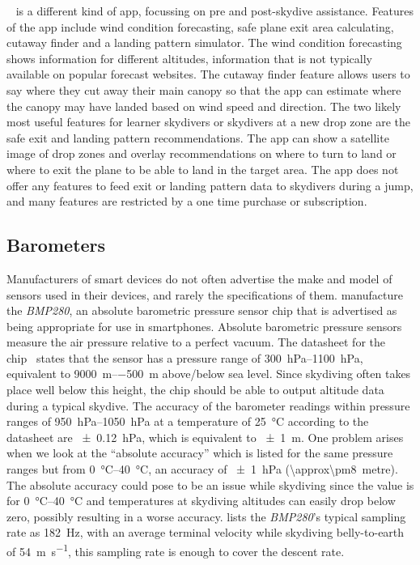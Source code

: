 \documentclass[11pt, twocolumn]{article}
\newcommand{\hPa}{\hecto\pascal} %
\begin{document}
~\cite{inc_spot_2017} is a different kind of app, focussing on pre and post-skydive assistance. Features of the app include wind condition forecasting, safe plane exit area calculating, cutaway finder and a landing pattern simulator. The wind condition forecasting shows information for different altitudes, information that is not typically available on popular forecast websites. The cutaway finder feature allows users to say where they cut away their main canopy so that the app can estimate where the canopy may have landed based on wind speed and direction. The two likely most useful features for learner skydivers or skydivers at a new drop zone are the safe exit and landing pattern recommendations. The app can show a satellite image of drop zones and overlay recommendations on where to turn to land or where to exit the plane to be able to land in the target area. The app does not offer any features to feed exit or landing pattern data to skydivers during a jump, and many features are restricted by a one time purchase or subscription.

\subsection{Barometers}\label{sec:barometers} %

Manufacturers of smart devices do not often advertise the make and model of sensors used in their devices, and rarely the specifications of them. \citeauthor{bosch_bmp280:_2016} manufacture the \textit{BMP280}, an absolute barometric pressure sensor chip that is advertised as being appropriate for use in smartphones. Absolute barometric pressure sensors measure the air pressure relative to a perfect vacuum. The datasheet for the chip~\cite{bosch_bmp280:_2016} states that the sensor has a pressure range of \SIrange{300}{1100}{\hPa}, equivalent to \SIrange{+9000}{-500}{\metre} above/below sea level. Since skydiving often takes place well below this height, the chip should be able to output altitude data during a typical skydive. The accuracy of the barometer readings within pressure ranges of \SIrange{950}{1050}{\hPa} at a temperature of \SI{25}{\degreeCelsius} according to the datasheet are \SI{\pm0.12}{\hPa}, which is equivalent to \SI{\pm1}{\metre}. One problem arises when we look at the ``absolute accuracy'' which is listed for the same pressure ranges but from \SIrange{0}{40}{\degreeCelsius}, an accuracy of \SI{\pm1}{\hPa} (\SI{\approx\pm8}{metre}). The absolute accuracy could pose to be an issue while skydiving since the value is for \SIrange{0}{40}{\degreeCelsius} and temperatures at skydiving altitudes can easily drop below zero, possibly resulting in a worse accuracy. \citeauthor{bosch_bmp280:_2016} lists the \textit{BMP280}'s typical sampling rate as \SI{182}{\Hz}, with an average terminal velocity while skydiving belly-to-earth of \SI{54}{\metre\per\second}, this sampling rate is enough to cover the descent rate.
\end{document}
